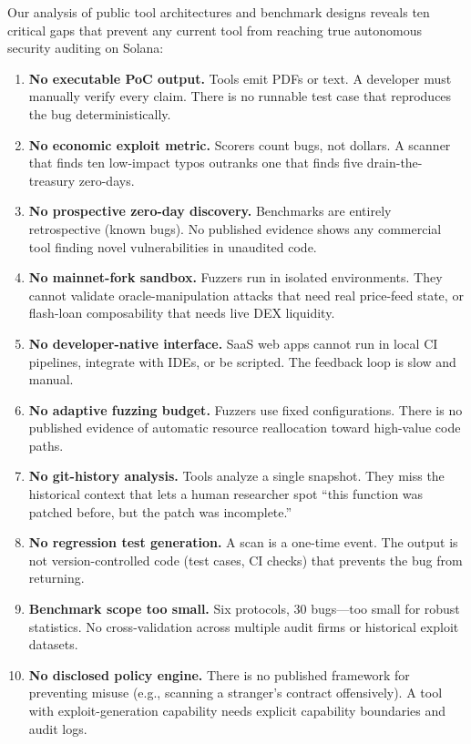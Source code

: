 \documentclass{article}
\begin{document}
Our analysis of public tool architectures and benchmark designs reveals ten critical gaps that prevent any current tool from reaching true autonomous security auditing on Solana:

\begin{enumerate}
  \item \textbf{No executable PoC output.} Tools emit PDFs or text. A developer must manually verify every claim. There is no runnable test case that reproduces the bug deterministically.
  \item \textbf{No economic exploit metric.} Scorers count bugs, not dollars. A scanner that finds ten low-impact typos outranks one that finds five drain-the-treasury zero-days.
  \item \textbf{No prospective zero-day discovery.} Benchmarks are entirely retrospective (known bugs). No published evidence shows any commercial tool finding novel vulnerabilities in unaudited code.
  \item \textbf{No mainnet-fork sandbox.} Fuzzers run in isolated environments. They cannot validate oracle-manipulation attacks that need real price-feed state, or flash-loan composability that needs live DEX liquidity.
  \item \textbf{No developer-native interface.} SaaS web apps cannot run in local CI pipelines, integrate with IDEs, or be scripted. The feedback loop is slow and manual.
  \item \textbf{No adaptive fuzzing budget.} Fuzzers use fixed configurations. There is no published evidence of automatic resource reallocation toward high-value code paths.
  \item \textbf{No git-history analysis.} Tools analyze a single snapshot. They miss the historical context that lets a human researcher spot ``this function was patched before, but the patch was incomplete.''
  \item \textbf{No regression test generation.} A scan is a one-time event. The output is not version-controlled code (test cases, CI checks) that prevents the bug from returning.
  \item \textbf{Benchmark scope too small.} Six protocols, 30 bugs---too small for robust statistics. No cross-validation across multiple audit firms or historical exploit datasets.
  \item \textbf{No disclosed policy engine.} There is no published framework for preventing misuse (e.g., scanning a stranger's contract offensively). A tool with exploit-generation capability needs explicit capability boundaries and audit logs.
\end{enumerate}
\end{document}
